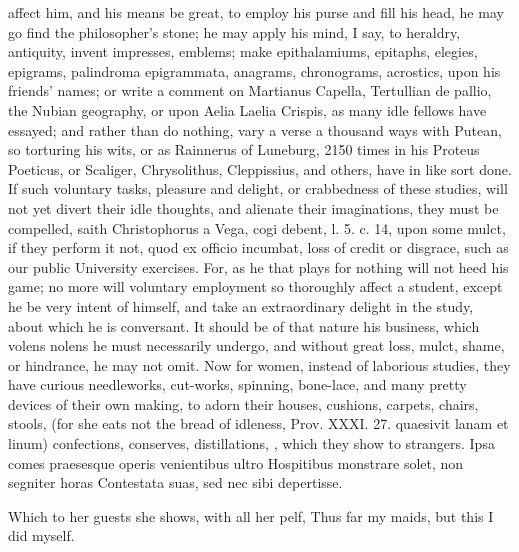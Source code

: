 {affect him, and his means be great, to employ his purse and fill his
head, he may go find the philosopher's stone; he may apply his mind, I
say, to heraldry, antiquity, invent impresses, emblems; make
epithalamiums, epitaphs, elegies, epigrams, palindroma epigrammata,
anagrams, chronograms, acrostics, upon his friends' names; or write a
comment on Martianus Capella, Tertullian de pallio, the Nubian
geography, or upon Aelia Laelia Crispis, as many idle fellows have
essayed; and rather than do nothing, vary a verse a thousand ways
with Putean, so torturing his wits, or as Rainnerus of Luneburg,
2150 times in his Proteus Poeticus, or Scaliger, Chrysolithus,
Cleppissius, and others, have in like sort done. If such voluntary
tasks, pleasure and delight, or crabbedness of these studies, will not
yet divert their idle thoughts, and alienate their imaginations, they
must be compelled, saith Christophorus a Vega, cogi debent, l. 5. c.
14, upon some mulct, if they perform it not, quod ex officio incumbat,
loss of credit or disgrace, such as our public University exercises.
For, as he that plays for nothing will not heed his game; no more will
voluntary employment so thoroughly affect a student, except he be very
intent of himself, and take an extraordinary delight in the study,
about which he is conversant. It should be of that nature his business,
which volens nolens he must necessarily undergo, and without great
loss, mulct, shame, or hindrance, he may not omit.
Now for women, instead of laborious studies, they have curious
needleworks, cut-works, spinning, bone-lace, and many pretty devices of
their own making, to adorn their houses, cushions, carpets, chairs,
stools, (for she eats not the bread of idleness, Prov. XXXI. 27.
quaesivit lanam et linum) confections, conserves, distillations, \etc{},
which they show to strangers.
Ipsa comes praesesque operis venientibus ultro
Hospitibus monstrare solet, non segniter horas
Contestata suas, sed nec sibi depertisse.

Which to her guests she shows, with all her pelf,
Thus far my maids, but this I did myself.

}
